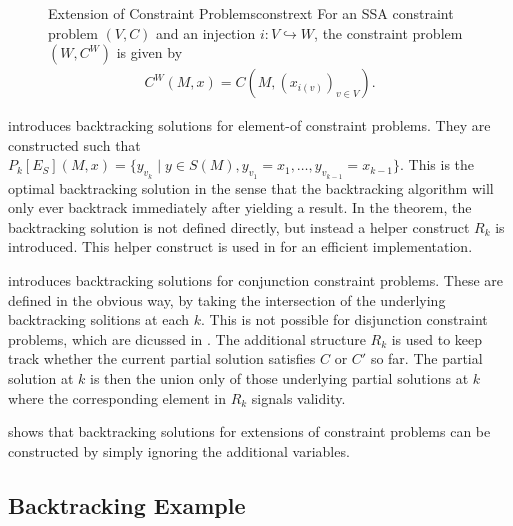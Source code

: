\begin{figure}[p]
    \begin{definition}{Extension of Constraint Problems}{constrext}
        For an SSA constraint problem $(V,C)$ and an injection
        $i:V\hookrightarrow W$, the constraint problem $(W,C^W)$ is given by
        \begin{align*}
            C^W(M,x)=C\left(M,\left(x_{i(v)}\right)_{v\in V}\right).
        \end{align*}
    \end{definition}
\end{figure}

\begin{figure}[p]
    
\end{figure}

\begin{figure}[p]
    
\end{figure}

     introduces backtracking solutions for element-of
    constraint problems.
    They are constructed such that
    $P_k[E_S](M,x)=\{y_{v_k}\mid y\in S(M), y_{v_1}=x_1,\dots,y_{v_{k-1}}=x_{k-1}\}$.
    This is the optimal backtracking solution in the sense that the backtracking
    algorithm will only ever backtrack immediately after yielding a result.
    In the theorem, the backtracking solution is not defined directly, but
    instead a helper construct $R_k$ is introduced.
    This helper construct is used in  for an efficient
    implementation.

     introduces backtracking solutions for conjunction
    constraint problems.
    These are defined in the obvious way, by taking the intersection of
    the underlying backtracking solitions at each $k$.
    This is not possible for disjunction constraint problems, which are dicussed
    in .
    The additional structure $R_k$ is used to keep track whether the current
    partial solution satisfies $C$ or $C'$ so far.
    The partial solution at $k$ is then the union only of those underlying
    partial solutions at $k$ where the corresponding element in $R_k$
    signals validity.

     shows that backtracking solutions for extensions of
    constraint problems can be constructed by simply ignoring the additional
    variables.

\subsection{Backtracking Example}

